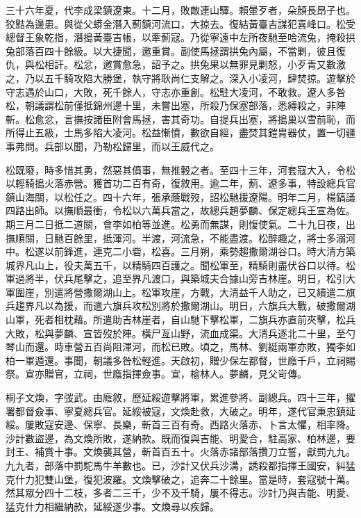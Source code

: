 \begin{pinyinscope}
三十六年夏，代李成梁鎮遼東。十二月，敗敵連山驛。賴暈歹者，朵顏長昂子也。狡黠為邊患。與從父蟒金潛入薊鎮河流口，大掠去。復結黃臺吉謀犯喜峰口。松受總督王象乾指，潛搗黃臺吉帳，以牽薊寇。乃從寧遠中左所夜馳至哈流兔，掩殺拱兔部落百四十餘級。以大捷聞，邀重賞。副使馬拯謂拱兔內屬，不當剿，彼且復仇，與松相訐。松忿，邀賞愈急，詔予之。拱兔果以無罪見剿怒，小歹青又數激之，乃以五千騎攻陷大勝堡，執守將耿尚仁支解之。深入小凌河，肆焚掠。遊擊於守志遇於山口，大敗，死千餘人，守志亦重創。松駐大凌河，不敢救。遼人多咎松，朝議謂松前僅抵錦州邊十里，未嘗出塞，所殺乃保塞部落，悉縛殺之，非陣斬。松愈忿，言撫按諸臣附會馬拯，害其奇功。自提兵出塞，將搗巢以雪前恥，而所得止五級，士馬多陷大凌河。松益慚憤，數欲自經，盡焚其鎧胄器仗，置一切疆事弗問。兵部以聞，乃勒松歸里，而以王威代之。

松既廢，時多惜其勇，然惡其僨事，無推轂之者。至四十三年，河套寇大入，令松以輕騎搗火落赤營。獲首功二百有奇，復敘用。逾二年，薊、遼多事，特設總兵官鎮山海關，以松任之。四十六年，張承蔭戰歿，詔松馳援遼陽。明年二月，楊鎬議四路出師。以撫順最衝，令松以六萬兵當之，故總兵趙夢麟、保定總兵王宣為佐。期三月二日抵二道關，會李如柏等並進。松勇而無謀，則愎使氣。二十九日夜，出撫順關，日馳百餘里，抵渾河。半渡，河流急，不能盡渡。松醉趣之，將士多溺河中。松遂以前鋒進，連克二小砦，松喜。三月朔，乘勢趨撒爾湖谷口。時大清方築城界凡山上，役夫萬五千，以精騎四百護之。聞松軍至，精騎則盡伏谷口以待。松軍過將半，伏兵尾擊之，追至界凡渡口，與築城夫合據山旁吉林崖。明日，松引大軍圍崖，別遣將營撒爾湖山上。松軍攻崖，方戰，大清益千人助之，已又續遣二旗兵趨界凡以為援，而遣六旗兵攻松別將於撒爾湖山。明日，六旗兵大戰，破撒爾湖山軍，死者相枕藉。所遣助吉林崖者，自山馳下擊松軍，二旗兵亦直前夾擊，松兵大敗，松與夢麟、宣皆歿於陣。橫尸亙山野，流血成渠。大清兵逐北二十里，至勺琴山而還。時車營五百尚阻渾河，而松已敗。頃之，馬林、劉綎兩軍亦敗，獨李如柏一軍遁還。事聞，朝議多咎松輕進。天啟初，贈少保左都督，世廕千戶，立祠賜祭。宣亦贈官，立祠，世廕指揮僉事。宣，榆林人。夢麟，見父岢傳。

桐子文煥，字弢武。由廕敘，歷延綏遊擊將軍，累進參將、副總兵。四十三年，擢署都督僉事、寧夏總兵官。延綏被寇，文煥赴救，大破之。明年，遂代官秉忠鎮延綏。屢敗寇安邊、保寧、長樂，斬首三百有奇。西路火落赤、卜言太懼，相率降。沙計數盜邊，為文煥所敗，遂納款。既而復與吉能、明愛合，駐高家、柏林邊，要封王、補賞十事。文煥襲其營，斬首百五十。火落赤諸部落攢刀立誓，獻罰九九。九九者，部落中罰駝馬牛羊數也。已，沙計又伏兵沙溝，誘殺都指揮王國安，糾猛克什力犯雙山堡，復犯波羅。文煥擊破之，追奔二十餘里。當是時，套寇號十萬。然其眾分四十二枝，多者二三千，少不及千騎，屢不得志。沙計乃與吉能、明愛、猛克什力相繼納款，延綏遂少事。文煥尋以疾歸。


\end{pinyinscope}

